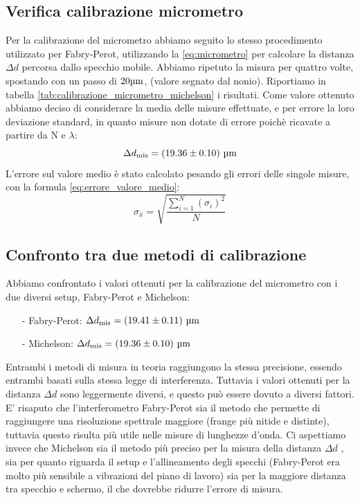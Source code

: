 \documentclass[letterpaper,12pt]{article}
\begin{document}
\subsection{Verifica calibrazione micrometro}
Per la calibrazione del micrometro abbiamo seguito lo stesso procedimento utilizzato per Fabry-Perot, 
utilizzando la  \ref{eq:micrometro} per calcolare la distanza $\Delta d$ percorsa dallo specchio mobile. Abbiamo ripetuto
la misura per quattro volte, spostando con un passo di $20 \text{\SIUnitSymbolMicro m}$, (valore segnato 
dal nonio). Riportiamo in tabella \ref{tab:calibrazione_micrometro_michelson} i risultati. Come valore ottenuto
abbiamo deciso di considerare la media delle misure effettuate, e per errore la loro deviazione standard, in quanto 
misure non dotate di errore poichè ricavate a partire da N e $\lambda$:
$$\Delta d_\text{mis} = (19.36 \pm0.10)\ \text{\SIUnitSymbolMicro m} $$
L'errore sul valore medio è stato calcolato pesando 
gli errori delle singole misure, con la formula \ref{eq:errore_valore_medio}:
\begin{equation}
    \sigma_{\bar{x}} = \sqrt{\frac{\sum_{i=1}^{N} (\sigma_i)^2}{N}}
    \label{eq:errore_valore_medio}
\end{equation}


\subsection{Confronto tra due metodi di calibrazione}

Abbiamo confrontato i valori ottenuti per la calibrazione del micrometro con i due diversi setup, Fabry-Perot e Michelson:
\begin{itemize}
    \item[-] Fabry-Perot: $\Delta d_\text{mis} = (19.41 \pm0.11)\ \text{\SIUnitSymbolMicro m} $
    \item[-] Michelson: $\Delta d_\text{mis} = (19.36 \pm0.10)\ \text{\SIUnitSymbolMicro m} $
\end{itemize}

Entrambi i metodi di misura in teoria raggiungono la stessa precisione, essendo entrambi basati sulla stessa legge di interferenza.
Tuttavia i valori ottenuti per la distanza $\Delta d$ sono leggermente diversi, e questo può essere dovuto a diversi fattori.
E' risaputo che l'interferometro Fabry-Perot sia il metodo che permette di raggiungere una risoluzione spettrale maggiore (frange più nitide e distinte), tuttavia questo risulta più utile nelle misure di lunghezze d'onda.
Ci aspettiamo invece che Michelson sia il metodo più preciso per la misura della distanza $\Delta d$ , sia per quanto riguarda il setup e l'allineamento degli specchi (Fabry-Perot era molto più sensibile a vibrazioni del piano di lavoro)
sia per la maggiore distanza tra specchio e schermo, il che dovrebbe ridurre l'errore di misura.\\
\end{document}
